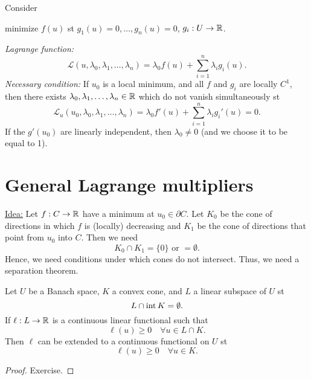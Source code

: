 \documentclass[../skript.tex]{subfiles}
\begin{document}
\begin{examplenumb} %
\label{ex:c1e33}
Consider
\begin{problemnonumb}
minimize $f(u)$ \ac{st} $g_1(u) = 0, \ldots, g_n(u) = 0$, $g_i : U \to \mathbb{R}$.
\end{problemnonumb}
\emph{Lagrange function:}
\[
	\mathcal{L}(u, \lambda_0, \lambda_1, \ldots, \lambda_n) = \lambda_0 f(u) + \sum_{i=1}^n \lambda_i g_i(u).
\]
\emph{Necessary condition:}
If $u_0$ is a local minimum, and all $f$ and $g_i$ are locally $C^1$, then there exists $\lambda_0, \lambda_1, \ldots, \lambda_n \in \mathbb{R}$ which do not vanish simultaneously \ac{st}
\[
	\mathcal{L}_u(u_0, \lambda_0, \lambda_1, \ldots, \lambda_n) = \lambda_0 f'(u) + \sum_{i=1}^n \lambda_i g_i'(u) = 0.
\]
If the $g'(u_0)$ are linearly independent, then $\lambda_0 \neq 0$ (and we choose it to be equal to 1).
\end{examplenumb}
\section{General Lagrange multipliers} %
\label{sec:c1e4}
\underline{Idea:} Let $f : C \to \mathbb{R}$ have a minimum at $u_0 \in \partial C$. Let $K_0$ be the cone of directions in which $f$ is (locally) decreasing and $K_1$ be the cone of directions that point from $u_0$ into $C$. Then we need
\[
	K_0 \cap K_1 = \{ 0 \} \text{ or } = \emptyset.
\]
Hence, we need conditions under which cones do not intersect. Thus, we need a separation theorem.
\begin{proposition} %
\label{prop:c1e34}
Let $U$ be a Banach space, $K$ a convex cone, and $L$ a linear subspace of $U$ \ac{st}
\[
	L \cap \operatorname{int} K = \emptyset.
\]
If $\ell : L \to \mathbb{R}$ is a continuous linear functional such that
\[
	\ell(u) \geq 0 \quad \forall u \in L \cap K.
\]
Then $\ell$ can be extended to a continuous functional on $U$ \ac{st}
\[
	\ell(u) \geq 0 \quad \forall u \in K.
\]
\end{proposition}
\begin{proof}
Exercise.
\end{proof}
\end{document}
